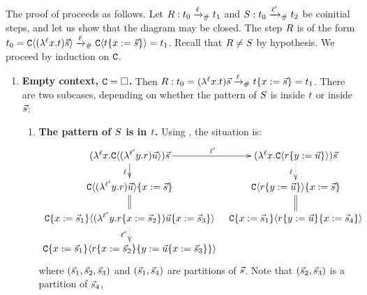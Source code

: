 The proof of  proceeds as follows.
Let $R : t_0 \mathrel{\xrightarrow{\ell}_{\mathtt{\#}}} t_1$ and $S : t_0 \mathrel{\xrightarrow{\ell'}_{\mathtt{\#}}} t_2$
be coinitial steps, and let us show that the diagram may be closed.
The step $R$ is of the form
$
  t_0 = \mathtt{C}\langle(\lambda^{\ell} x. t)\vec{s}\rangle
           \mathrel{\xrightarrow{\ell}_{\mathtt{\#}}} \mathtt{C}\langle t\{x := \vec{s}\}\rangle = t_1
$.
Recall that $R \neq S$ by hypothesis.
We proceed by induction on $\mathtt{C}$.
\begin{enumerate}
\item {\bf Empty context, $\mathtt{C} = \Box$.}
  Then
  $
    R : t_0 = (\lambda^{\ell} x. t)\vec{s}
             \mathrel{\xrightarrow{\ell}_{\mathtt{\#}}} t\{x := \vec{s}\} = t_1
  $.
  There are two subcases, depending on whether the pattern of $S$ is inside $t$
  or inside $\vec{s}$:
  \begin{enumerate}
  \item {\bf The pattern of $S$ is in $t$.}
    \label{strong_permutation__case_redextwo_inside_tm}
    Using , the situation is:
    \[
    \xymatrix@C=.25cm@R=.5cm{
     (\lamp{\lab}{\var}{\conof{(\lamp{\lab'}{\vartwo}{\tmfour}) \ls{\tmthree}}}) \ls{\tmtwo}
                        \ar[d]_{\lab}
                        \ar[r]^{\lab'} &
     (\lamp{\lab}{\var}{\conof{\subs{\tmfour}{\vartwo}{\ls{\tmthree}}}}) \ls{\tmtwo}
                        \ar@{.>}[d]_{\lab} \\
     \subs{\conof{(\lamp{\lab'}{\vartwo}{\tmfour}) \ls{\tmthree}}}{\var}{\ls{\tmtwo}}
                        \ar@{=}[d] &
     \subs{\conof{\subs{\tmfour}{\vartwo}{\ls{\tmthree}}}}{\var}{\ls{\tmtwo}}
                        \ar@{=}[d] \\
     \subs{\con}{\var}{\ls{\tmtwo}_1}
       \of{(\lamp{\lab'}{\vartwo}{\subs{\tmfour}{\var}{\ls{\tmtwo}_2}})
           \subs{\ls{\tmthree}}{\var}{\ls{\tmtwo}_3}}
                        \ar@{.>}[d]_-{\lab'} &
     \subs{\con}{\var}{\ls{\tmtwo}_1}
       \of{\subs{\subs{\tmfour}{\vartwo}{\ls{\tmthree}}}{\var}{\ls{\tmtwo}_4}} \\
     \subs{\con}{\var}{\ls{\tmtwo}_1}
       \of{\subs{\subs{\tmfour}{\var}{\ls{\tmtwo}_2}}{\vartwo}
                 {\subs{\ls{\tmthree}}{\var}{\ls{\tmtwo}_3}}}
                         &  \\
    }
    \]
    where $(\vec{s}_1,\vec{s}_2,\vec{s}_3)$ and $(\vec{s}_1,\vec{s}_4)$ are partitions of $\vec{s}$.
    Note that $(\vec{s}_2, \vec{s}_3)$ is a partition of $\vec{s}_4$,

\end{enumerate}
\end{enumerate}
